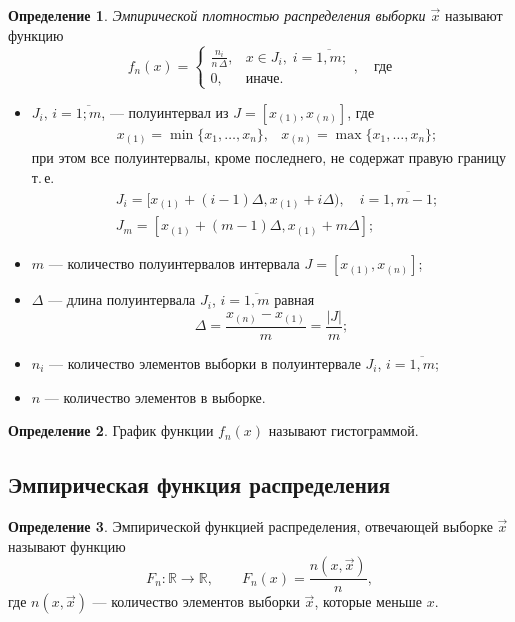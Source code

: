 \documentclass[a4paper, 12pt]{article}
\theoremstyle{definition}
\newtheorem{defn}{Определение}[section]
\begin{document}
\begin{defn}
	\emph{Эмпирической плотностью распределения  выборки $\vec{x}$} называют функцию
	\begin{equation}
	f_n(x) =
	\begin{cases}
	\frac{n_i}{n \, \Delta}, &x \in J_i,\; i = \overline{1, m};\\
	0, &\text{иначе}.
	\end{cases}, \quad \text{где}
	\end{equation}
	\begin{itemize}
		\item $J_i,\, i = \overline{1; m}$, --- полуинтервал из $J = [x_{(1)}, x_{(n)}]$, где 
		\begin{align}
		&x_{(1)} = \min\{ x_1, \dots, x_n \}, &x_{(n)} = \max\{ x_1, \dots, x_n \};
		\end{align}
		при этом все полуинтервалы, кроме последнего, не содержат правую границу т.\,е.
		\begin{align}
		&J_i = [ x_{(1)} + (i-1)\Delta, x_{(1)} + i\Delta), \quad i = \overline{1, m-1};
		\\
		&J_m = [ x_{(1)} + (m-1)\Delta, x_{(1)} + m\Delta];
		\end{align}
		\item $m$ --- количество полуинтервалов интервала $J = [x_{(1)}, x_{(n)}]$;
		\item $\Delta$ --- длина полуинтервала $J_i$, $i = \overline{1, m}$ равная
		\begin{equation}
		\Delta = \frac{x_{(n)} - x_{(1)}}{m} = \frac{|J|}{m};
		\end{equation}
		\item $n_i$ --- количество элементов выборки в полуинтервале $J_i$, $i = \overline{1, m}$;
		\item $n$ --- количество элементов в выборке.
		
	\end{itemize}
\end{defn}

\begin{defn}
	График функции $f_n(x)$ называют гистограммой.
\end{defn}

\subsection{Эмпирическая функция распределения}


\begin{defn}
	Эмпирической функцией распределения, отвечающей выборке $\vec{x}$ называют функцию
	\begin{equation}
	F_n\colon \mathbb{R} \to \mathbb{R}, \qquad F_n(x) = \frac{n(x, \vec{x})}{n},
	\end{equation} 
	где $n(x, \vec{x})$ --- количество элементов выборки $\vec{x}$, которые меньше $x$.
\end{defn}
\end{document}
